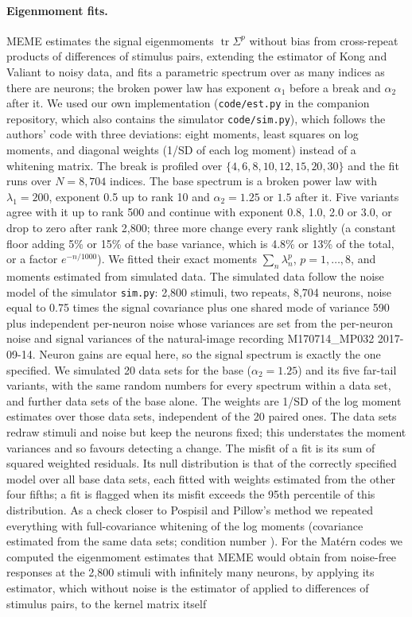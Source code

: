 \documentclass[11pt]{article}
\theoremstyle{definition}
\begin{document}
\paragraph{Eigenmoment fits.} MEME \cite{pp2025} estimates the signal eigenmoments $\operatorname{tr}\Sigma^p$ without bias from cross-repeat products of differences of stimulus pairs, extending the estimator of Kong and Valiant \cite{kv2017} to noisy data, and fits a parametric spectrum over as many indices as there are neurons; the broken power law has exponent $\alpha_1$ before a break and $\alpha_2$ after it. We used our own implementation (\texttt{code/est.py} in the companion repository, which also contains the simulator \texttt{code/sim.py}), which follows the authors' code \cite{ppcode} with three deviations: eight moments, least squares on log moments, and diagonal weights (1/SD of each log moment) instead of a whitening matrix. The break is profiled over $\{4, 6, 8, 10, 12, 15, 20, 30\}$ and the fit runs over $N = 8{,}704$ indices. The base spectrum is a broken power law with $\lambda_1 = 200$, exponent 0.5 up to rank 10 and $\alpha_2 = 1.25$ or $1.5$ after it. Five variants agree with it up to rank 500 and continue with exponent 0.8, 1.0, 2.0 or 3.0, or drop to zero after rank 2,800; three more change every rank slightly (a constant floor adding 5\% or 15\% of the base variance, which is 4.8\% or 13\% of the total, or a factor $e^{-n/1000}$). We fitted their exact moments $\sum_n \lambda_n^p$, $p = 1, \dots, 8$, and moments estimated from simulated data. The simulated data follow the noise model of the simulator \texttt{sim.py}: 2,800 stimuli, two repeats, 8,704 neurons, noise equal to 0.75 times the signal covariance plus one shared mode of variance 590 plus independent per-neuron noise whose variances are set from the per-neuron noise and signal variances of the natural-image recording M170714\_MP032 2017-09-14. Neuron gains are equal here, so the signal spectrum is exactly the one specified. We simulated 20 data sets for the base ($\alpha_2 = 1.25$) and its five far-tail variants, with the same random numbers for every spectrum within a data set, and \MemeNW{} further data sets of the base alone. The weights are 1/SD of the log moment estimates over those \MemeNW{} data sets, independent of the 20 paired ones. The data sets redraw stimuli and noise but keep the neurons fixed; this understates the moment variances and so favours detecting a change. The misfit of a fit is its sum of squared weighted residuals. Its null distribution is that of the correctly specified model over all \MemeNB{} base data sets, each fitted with weights estimated from the other four fifths; a fit is flagged when its misfit exceeds the 95th percentile of this distribution. As a check closer to Pospisil and Pillow's method we repeated everything with full-covariance whitening of the log moments (covariance estimated from the same data sets; condition number \MemeFullCond{}). For the Mat\'ern codes we computed the eigenmoment estimates that MEME would obtain from noise-free responses at the 2,800 stimuli with infinitely many neurons, by applying its estimator, which without noise is the estimator of \cite{kv2017} applied to differences of stimulus pairs, to the kernel matrix itself 
\end{document}
